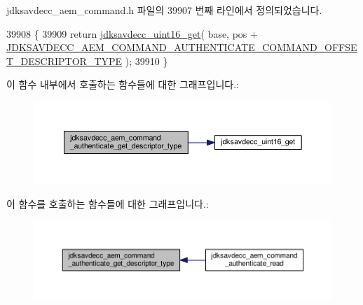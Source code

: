 jdksavdecc\+\_\+aem\+\_\+command.\+h 파일의 39907 번째 라인에서 정의되었습니다.


\begin{DoxyCode}
39908 \{
39909     \textcolor{keywordflow}{return} \hyperlink{group__endian_ga3fbbbc20be954aa61e039872965b0dc9}{jdksavdecc\_uint16\_get}( base, pos + 
      \hyperlink{group__command__authenticate_gae59b6008707cccaab8f575f3e83dcea4}{JDKSAVDECC\_AEM\_COMMAND\_AUTHENTICATE\_COMMAND\_OFFSET\_DESCRIPTOR\_TYPE}
       );
39910 \}
\end{DoxyCode}


이 함수 내부에서 호출하는 함수들에 대한 그래프입니다.\+:
\nopagebreak
\begin{figure}[H]
\begin{center}
\leavevmode
\includegraphics[width=350pt]{group__command__authenticate_gab4d7a396b0a39e094bb57a21c5697cf0_cgraph}
\end{center}
\end{figure}




이 함수를 호출하는 함수들에 대한 그래프입니다.\+:
\nopagebreak
\begin{figure}[H]
\begin{center}
\leavevmode
\includegraphics[width=350pt]{group__command__authenticate_gab4d7a396b0a39e094bb57a21c5697cf0_icgraph}
\end{center}
\end{figure}


